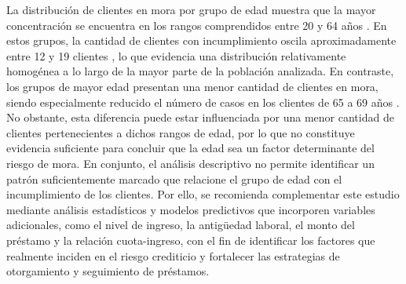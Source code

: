 La distribución de clientes en mora por grupo de edad muestra que la mayor concentración se encuentra en los rangos comprendidos entre
20 y 64 años
. En estos grupos, la cantidad de clientes con incumplimiento oscila aproximadamente entre
12 y 19 clientes
, lo que evidencia una distribución relativamente homogénea a lo largo de la mayor parte de la población analizada.
En contraste, los grupos de mayor edad presentan una menor cantidad de clientes en mora, siendo especialmente reducido el número de casos en los clientes de
65 a 69 años
. No obstante, esta diferencia puede estar influenciada por una menor cantidad de clientes pertenecientes a dichos rangos de edad, por lo que no constituye evidencia suficiente para concluir que la edad sea un factor determinante del riesgo de mora.
En conjunto, el análisis descriptivo no permite identificar un patrón suficientemente marcado que relacione el grupo de edad con el incumplimiento de los clientes. Por ello, se recomienda complementar este estudio mediante análisis estadísticos y modelos predictivos que incorporen variables adicionales, como el nivel de ingreso, la antigüedad laboral, el monto del préstamo y la relación cuota-ingreso, con el fin de identificar los factores que realmente inciden en el riesgo crediticio y fortalecer las estrategias de otorgamiento y seguimiento de préstamos.